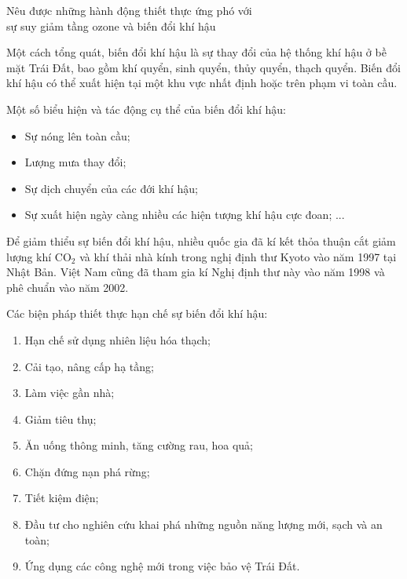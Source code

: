 \begin{dang}{Nêu được những hành động thiết thực ứng phó với\\ sự suy giảm tầng ozone và biến đổi khí hậu}
{		Một cách tổng quát, biến đổi khí hậu là sự thay đổi của hệ thống khí hậu ở bề mặt Trái Đất, bao gồm khí quyển, sinh quyển, thủy quyển, thạch quyển. Biến đổi khí hậu có thể xuất hiện tại một khu vực nhất định hoặc trên phạm vi toàn cầu.
		
		Một số biểu hiện và tác động cụ thể của biến đổi khí hậu:
		\begin{itemize}
			\item Sự nóng lên toàn cầu;
			\item Lượng mưa thay đổi;
			\item Sự dịch chuyển của các đới khí hậu;
			\item Sự xuất hiện ngày càng nhiều các hiện tượng khí hậu cực đoan; ...
		\end{itemize}
		
		Để giảm thiểu sự biến đổi khí hậu, nhiều quốc gia đã kí kết thỏa thuận cắt giảm lượng khí CO$_2$ và khí thải nhà kính trong nghị định thư Kyoto vào năm 1997 tại Nhật Bản. Việt Nam cũng đã tham gia kí Nghị định thư này vào năm 1998 và phê chuẩn vào năm 2002.
		
		Các biện pháp thiết thực hạn chế sự biến đổi khí hậu:
		\begin{enumerate}
			\item Hạn chế sử dụng nhiên liệu hóa thạch;
			\item Cải tạo, nâng cấp hạ tầng;
			\item Làm việc gần nhà;
			\item Giảm tiêu thụ;
			\item Ăn uống thông minh, tăng cường rau, hoa quả;
			\item Chặn đứng nạn phá rừng;
			\item Tiết kiệm điện;
			\item Đầu tư cho nghiên cứu khai phá những nguồn năng lượng mới, sạch và an toàn;
			\item Ứng dụng các công nghệ mới trong việc bảo vệ Trái Đất.
		\end{enumerate}
	}
\end{dang}


